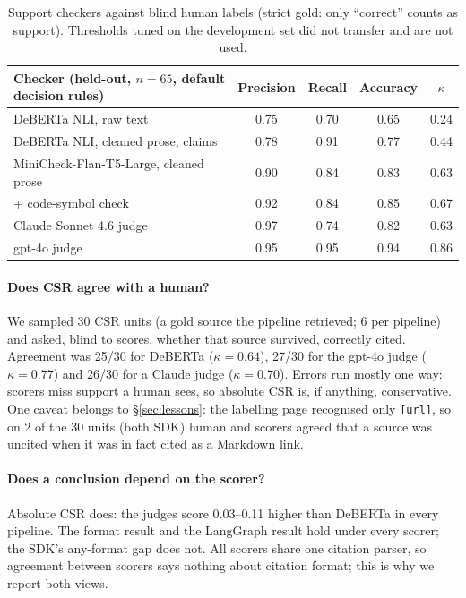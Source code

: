 \documentclass[11pt]{article}
\newcommand{\code}[1]{\texttt{#1}}
\begin{document}
\begin{table}[t]
\centering
\small
\begin{tabular}{lcccc}
\toprule
Checker (held-out, $n=65$, default decision rules) & Precision & Recall & Accuracy & $\kappa$ \\
\midrule
DeBERTa NLI, raw text & 0.75 & 0.70 & 0.65 & 0.24 \\
DeBERTa NLI, cleaned prose, claims & 0.78 & 0.91 & 0.77 & 0.44 \\
MiniCheck-Flan-T5-Large, cleaned prose & 0.90 & 0.84 & 0.83 & 0.63 \\
\quad + code-symbol check & 0.92 & 0.84 & 0.85 & 0.67 \\
Claude Sonnet 4.6 judge & 0.97 & 0.74 & 0.82 & 0.63 \\
gpt-4o judge & 0.95 & 0.95 & 0.94 & 0.86 \\
\bottomrule
\end{tabular}
\caption{Support checkers against blind human labels (strict gold: only ``correct'' counts as
support). Thresholds tuned on the development set did not transfer and are not used.}
\label{tab:verifiers}
\end{table}

\paragraph{Does CSR agree with a human?} We sampled 30 CSR units (a gold source the pipeline
retrieved; 6 per pipeline) and asked, blind to scores, whether that source survived, correctly
cited. Agreement was 25/30 for DeBERTa ($\kappa = 0.64$), 27/30 for the gpt-4o judge
($\kappa = 0.77$) and 26/30 for a Claude judge ($\kappa = 0.70$). Errors run mostly one way:
scorers miss support a human sees, so absolute CSR is, if anything, conservative. One caveat
belongs to \S\ref{sec:lessons}: the labelling page recognised only \code{[url]}, so on 2 of the 30
units (both SDK) human and scorers agreed that a source was uncited when it was in fact cited as a
Markdown link.

\paragraph{Does a conclusion depend on the scorer?} Absolute CSR does: the judges score
0.03--0.11 higher than DeBERTa in every pipeline. The format result and the LangGraph result hold
under every scorer; the SDK's any-format gap does not. All scorers share one citation parser, so
agreement between scorers says nothing about citation format; this is why we report both views.
\end{document}
